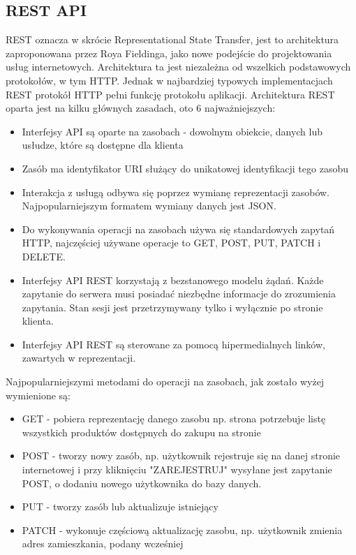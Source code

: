 \documentclass[12pt]{article}
\begin{document}
\begin{sloppypar}
{\subsection{REST API}
{
  REST oznacza w skrócie Representational State Transfer, jest to architektura zaproponowana przez Roya Fieldinga, jako nowe podejście do projektowania 
  usług internetowych. Architektura ta jest niezależna od wszelkich podstawowych protokołów, w tym HTTP. Jednak w najbardziej typowych implementacjach REST 
  protokół HTTP pełni funkcję protokołu aplikacji.\cite{mc-rest}
  Architektura REST oparta jest na kilku głównych zasadach, oto 6 najważniejszych\cite{mc-rest}:
  \begin{itemize}
    \item Interfejsy API są oparte na zasobach - dowolnym obiekcie, danych lub usłudze, które są dostępne dla klienta
    \item Zasób ma identyfikator URI służący do unikatowej identyfikacji tego zasobu
    \item Interakcja z usługą odbywa się poprzez wymianę reprezentacji zasobów. Najpopularniejszym formatem wymiany danych jest JSON.
    \item Do wykonywania operacji na zasobach używa się standardowych zapytań HTTP, najczęściej używane operacje to GET, POST, PUT, PATCH i DELETE.
    \item Interfejsy API REST korzystają z bezstanowego modelu żądań. Każde zapytanie do serwera musi posiadać niezbędne informacje do zrozumienia zapytania. Stan sesji jest przetrzymywany tylko i wyłącznie po stronie klienta.
    \item Interfejsy API REST są sterowane za pomocą hipermedialnych linków, zawartych w reprezentacji.
  \end{itemize}
  Najpopularniejszymi metodami do operacji na zasobach, jak zostało wyżej wymienione są:
  \begin{itemize}
    \item GET - pobiera reprezentację danego zasobu np. strona potrzebuje listę wszystkich produktów dostępnych do zakupu na stronie
    \item POST - tworzy nowy zasób, np. użytkownik rejestruje się na danej stronie internetowej i przy kliknięciu "ZAREJESTRUJ" wysyłane jest zapytanie POST, o dodaniu nowego użytkownika do bazy danych.
    \item PUT - tworzy zasób lub aktualizuje istniejący
    \item PATCH - wykonuje częściową aktualizację zasobu, np. użytkownik zmienia adres zamieszkania, podany wcześniej

\end{itemize}}}
\end{sloppypar}
\end{document}
